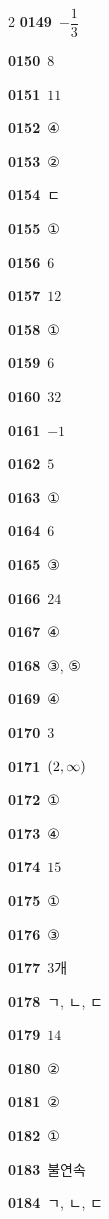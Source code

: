 \documentclass[10pt,a4paper]{article}
\begin{document}
\begin{multicols}{2}
\noindent\textbf{0149}\ $-\dfrac{1}{3}$\par
\noindent\textbf{0150}\ $8$\par
\noindent\textbf{0151}\ $11$\par
\noindent\textbf{0152}\ ④\par
\noindent\textbf{0153}\ ②\par
\noindent\textbf{0154}\ ㄷ\par
\noindent\textbf{0155}\ ①\par
\noindent\textbf{0156}\ $6$\par
\noindent\textbf{0157}\ $12$\par
\noindent\textbf{0158}\ ①\par
\noindent\textbf{0159}\ $6$\par
\noindent\textbf{0160}\ $32$\par
\noindent\textbf{0161}\ $-1$\par
\noindent\textbf{0162}\ $5$\par
\noindent\textbf{0163}\ ①\par
\noindent\textbf{0164}\ $6$\par
\noindent\textbf{0165}\ ③\par
\noindent\textbf{0166}\ $24$\par
\noindent\textbf{0167}\ ④\par
\noindent\textbf{0168}\ ③, ⑤\par
\noindent\textbf{0169}\ ④\par
\noindent\textbf{0170}\ $3$\par
\noindent\textbf{0171}\ $(2{,}\mkern3mu\mathopen{}\infty)$\par
\noindent\textbf{0172}\ ①\par
\noindent\textbf{0173}\ ④\par
\noindent\textbf{0174}\ $15$\par
\noindent\textbf{0175}\ ①\par
\noindent\textbf{0176}\ ③\par
\noindent\textbf{0177}\ $3$개\par
\noindent\textbf{0178}\ ㄱ, ㄴ, ㄷ\par
\noindent\textbf{0179}\ $14$\par
\noindent\textbf{0180}\ ②\par
\noindent\textbf{0181}\ ②\par
\noindent\textbf{0182}\ ①\par
\noindent\textbf{0183}\ 불연속\par
\noindent\textbf{0184}\ ㄱ, ㄴ, ㄷ\par

\end{multicols}
\end{document}
